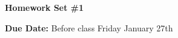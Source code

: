 




\thispagestyle{fancy}






\begin{center}
{\huge \textbf{Homework Set \#1}}
\large

{\textbf{ Due Date:} Before class Friday January 27th  }
\end{center}

